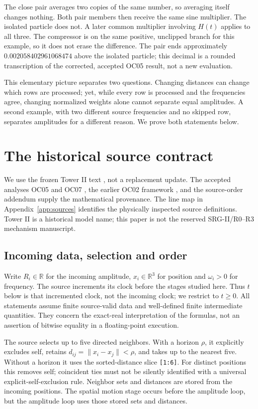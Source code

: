 \documentclass[11pt,a4paper]{article}
\theoremstyle{definition}
\theoremstyle{remark}\newtheorem{remark}[theorem]{Remark}
\newcommand{\R}{\mathbb R}
\numberwithin{equation}{section}
\begin{document}
The close pair averages two copies of the same number, so averaging itself changes
nothing. Both pair members then receive the same sine multiplier. The isolated
particle does not. A later common multiplier involving $H(t)$ applies to all three.
The compressor is on the same positive, unclipped branch for this example, so it
does not erase the difference. The pair ends approximately
$0.002058402961068474$ above the isolated particle; this decimal is a rounded
transcription of the corrected, accepted OC05 result, not a new evaluation.

This elementary picture separates two questions. Changing distances can change which
rows are processed; yet, while every row is processed and the frequencies agree,
changing normalized weights alone cannot separate equal amplitudes. A second example,
with two different source frequencies and no skipped row, separates amplitudes for
a different reason. We prove both statements below.

\section{The historical source contract}\label{sec:source}
We use the frozen Tower II text \cite{T}, not a replacement update.
The accepted analyses OC05 and OC07 \cite{OC05,OC07}, the earlier OC02 framework
\cite{G}, and the source-order addendum \cite{A} supply the mathematical provenance.
The line map in Appendix~\ref{app:sources} identifies the physically inspected source
definitions. Tower II is a historical model name; this paper is not the reserved
SRG-II/R0--R3 mechanism manuscript.

\subsection{Incoming data, selection and order}
Write $R_i\in\R$ for the incoming amplitude, $x_i\in\R^3$ for position and
$\omega_i>0$ for frequency. The source increments its clock before the stages
studied here. Thus $t$ below is that incremented clock, not the incoming clock; we restrict to $t\geq0$.
All statements assume finite source-valid data and well-defined finite intermediate
quantities. They concern the exact-real interpretation of the formulas, not an
assertion of bitwise equality in a floating-point execution.

The source selects up to five directed neighbors. With a horizon $\rho$, it explicitly
excludes self, retains $d_{ij}=\|x_i-x_j\|<\rho$, and takes up to the nearest five.
Without a horizon it uses the sorted-distance slice \texttt{[1:6]}.
For distinct positions this removes self; coincident ties must not be silently
identified with a universal explicit-self-exclusion rule.
Neighbor sets and distances are stored from the incoming positions. The spatial
motion stage occurs before the amplitude loop, but the amplitude loop uses those
stored sets and distances.
\end{document}
